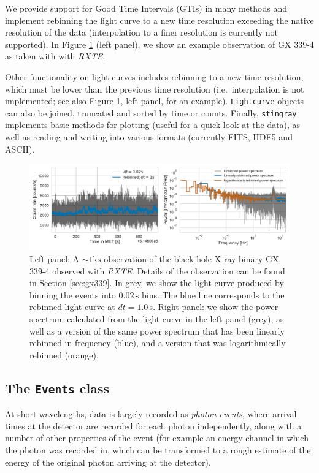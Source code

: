 \documentclass[twocolumn]{aastex62}
\newcommand{\project}[1]{\textsl{#1}\xspace}
\newcommand{\rxte}{\project{RXTE}\xspace}
\newcommand{\stingray}{\texttt{stingray}\xspace}
\newcommand{\lightcurve}{\texttt{Lightcurve}\xspace}
\begin{document}
We provide support for Good Time Intervals (GTIs) in many methods and implement rebinning the light curve to a new time resolution exceeding the native resolution of the data (interpolation to a finer resolution is currently not supported). In Figure \ref{fig:psd} (left panel), we show an example observation of GX 339-4 as taken with with \rxte.

Other functionality on light curves includes rebinning to a new time resolution, which must be lower than the previous time resolution (i.e.\ interpolation is not implemented; see also Figure \ref{fig:psd}, left panel, for an example). 
\lightcurve objects can also be joined, truncated and sorted by time or counts. Finally, \stingray implements basic methods for plotting (useful for a quick look at the data), as well as reading and writing into various formats (currently FITS, HDF5 and ASCII).

\begin{figure}[htbp]
\begin{center}
\includegraphics[width=\textwidth]{../figures/example_lc_ps.pdf}
\caption{Left panel: A $\sim 1 \mathrm{ks}$ observation of the black hole X-ray binary GX 339-4 observed with \rxte. Details of the observation can be found in Section \ref{sec:gx339}. In grey, we show the light curve produced by binning the events into $0.02\,\mathrm{s}$ bins. The blue line corresponds to the rebinned light curve at $dt = 1.0\,\mathrm{s}$. Right panel: we show the power spectrum calculated from the light curve in the left panel (grey), as well as a version of the same power spectrum that has been linearly rebinned in frequency (blue), and a version that was logarithmically rebinned (orange).}
\label{fig:psd}
\end{center}
\end{figure}

\subsection{The \texttt{Events} class}

At short wavelengths, data is largely recorded as \textit{photon events}, where arrival times at the detector are recorded for each photon independently, along with a number of other properties of the event (for example an energy channel in which the photon was recorded in, which can be transformed to a rough estimate of the energy of the original photon arriving at the detector).
\end{document}
